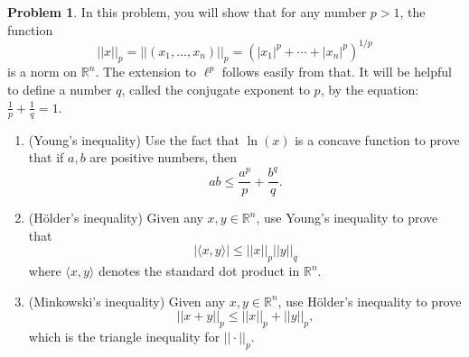 \documentclass[12pt]{article}
\theoremstyle{definition}
\newtheorem{ex}{Problem}
\begin{document}
\begin{ex}
	In this problem, you will show that for any number $p > 1$, the function \begin{equation*}
		||x||_p = ||(x_1, \dots, x_n)||_p = (|x_1|^p + \cdots + |x_n|^p)^{1/p}
	\end{equation*}
	is a norm on $\mathbb{R}^n$.
	The extension to $\ell^p$ follows easily from that.
	It will be helpful to define a number $q$, called the conjugate exponent to $p$, by the equation: $\frac{1}{p} + \frac{1}{q} = 1$.
	\begin{enumerate}[label=(\alph*)]
		\item (Young's inequality) Use the fact that $\ln(x)$ is a concave function to prove that if $a, b$ are positive numbers, then \begin{equation*}
			      ab \leq \frac{a^p}{p} + \frac{b^q}{q}.
		      \end{equation*}
		\item (Hölder's inequality) Given any $x, y \in \mathbb{R}^n$, use Young's inequality to prove that \begin{equation*}
			      |\langle x, y \rangle| \leq ||x||_p||y||_q
		      \end{equation*}
		      where $\langle x, y \rangle$ denotes the standard dot product in $\mathbb{R}^n$.
		\item (Minkowski's inequality) Given any $x, y \in \mathbb{R}^n$, use Hölder's inequality to prove \begin{equation*}
			      ||x+y||_p \leq ||x||_p + ||y||_p,
		      \end{equation*}
		      which is the triangle inequality for $||\cdot||_p$.
	\end{enumerate}
\end{ex}
\end{document}
